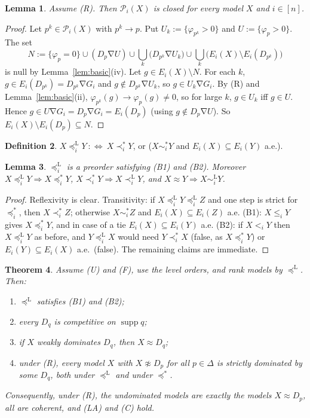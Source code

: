 \documentclass[11pt]{article}
\newtheorem{theorem}{Theorem}[section]
\newtheorem{lemma}[theorem]{Lemma}
\theoremstyle{definition}
\newtheorem{definition}[theorem]{Definition}
\newcommand{\supp}{\operatorname{supp}}
\newcommand{\Pc}{\mathcal P}
\newcommand{\sd}{\mathbin{\nabla}}
\newcommand{\ws}{\preceq^{*}}
\newcommand{\wss}{\prec^{*}}
\newcommand{\wst}{\sim^{*}}
\newcommand{\wl}{\preceq^{\mathrm L}}
\newcommand{\wls}{\prec^{\mathrm L}}
\begin{document}
\begin{lemma}\label{lem:closedcovers}
Assume (R). Then $\Pc_i(X)$ is closed for every model $X$ and $i\in[n]$.
\end{lemma}

\begin{proof}
Let $p^k\in\Pc_i(X)$ with $p^k\to p$. Put $U_k:=\{\varphi_{p^k}>0\}$ and $U:=\{\varphi_p>0\}$. The set
\[
N:=\{\varphi_p=0\}\cup(D_p\sd U)\cup\bigcup_k\big(D_{p^k}\sd U_k\big)\cup\bigcup_k\big(E_i(X)\setminus E_i(D_{p^k})\big)
\]
is null by Lemma~\ref{lem:basic}(iv). Let $g\in E_i(X)\setminus N$. For each $k$, $g\in E_i(D_{p^k})=D_{p^k}\sd G_i$ and $g\notin D_{p^k}\sd U_k$, so $g\in U_k\sd G_i$. By (R) and Lemma~\ref{lem:basic}(ii), $\varphi_{p^k}(g)\to\varphi_p(g)\ne0$, so for large $k$, $g\in U_k$ iff $g\in U$. Hence $g\in U\sd G_i=D_p\sd G_i=E_i(D_p)$ (using $g\notin D_p\sd U$). So $E_i(X)\setminus E_i(D_p)\subseteq N$.
\end{proof}

\begin{definition}\label{def:lex}
$X\wl_iY\ :\iff\ X\wss_iY$, or ($X\wst_iY$ and $E_i(X)\subseteq E_i(Y)$ a.e.).
\end{definition}

\begin{lemma}\label{lem:lex}
$\wl_i$ is a preorder satisfying (B1) and (B2). Moreover $X\wl_iY\Rightarrow X\ws_iY$, $X\wss_iY\Rightarrow X\wls_iY$, and $X\approx Y\Rightarrow X\sim^{\mathrm L}_iY$.
\end{lemma}

\begin{proof}
Reflexivity is clear. Transitivity: if $X\wl_iY\wl_iZ$ and one step is strict for $\ws_i$, then $X\wss_iZ$; otherwise $X\wst_iZ$ and $E_i(X)\subseteq E_i(Z)$ a.e. (B1): $X\le_iY$ gives $X\ws_iY$, and in case of a tie $E_i(X)\subseteq E_i(Y)$ a.e. (B2): if $X<_iY$ then $X\wl_iY$ as before, and $Y\wl_iX$ would need $Y\wss_iX$ (false, as $X\ws_iY$) or $E_i(Y)\subseteq E_i(X)$ a.e.\ (false). The remaining claims are immediate.
\end{proof}

\begin{theorem}\label{thm:strict}
Assume (U) and (F), use the level orders, and rank models by $\wl$. Then:
\begin{enumerate}[label=(\alph*)]
\item $\wl$ satisfies (B1) and (B2);
\item every $D_q$ is competitive on $\supp q$;
\item if $X$ weakly dominates $D_q$, then $X\approx D_q$;
\item under (R), every model $X$ with $X\not\approx D_p$ for all $p\in\Delta$ is strictly dominated by some $D_q$, both under $\wl$ and under $\ws$.
\end{enumerate}
Consequently, under (R), the undominated models are exactly the models $X\approx D_p$, all are coherent, and (LA) and (C) hold.
\end{theorem}
\end{document}
